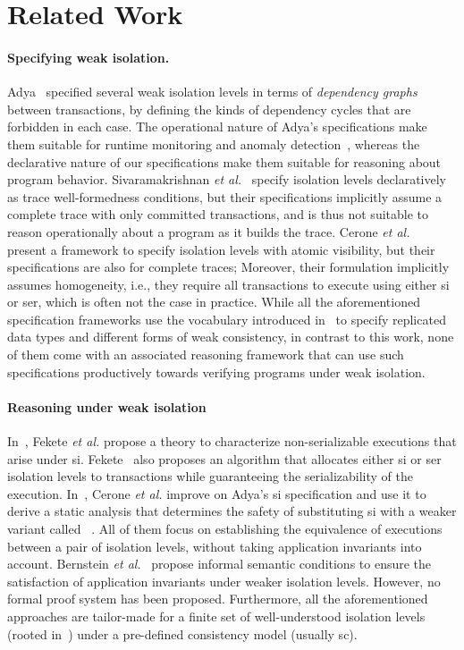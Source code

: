 \section{Related Work}
\label{sec:relatedwork}

\paragraph{Specifying weak isolation.}
Adya~\cite{adyaphd} specified several weak isolation levels in terms
of \emph{dependency graphs} between transactions, by defining the
kinds of dependency cycles that are forbidden in each case. The
operational nature of Adya's specifications make them suitable for
runtime monitoring and anomaly
detection~\cite{kemmevldb,feketesigmod08,pssi2011}, whereas the
declarative nature of our specifications make them suitable for
reasoning about program behavior. Sivaramakrishnan \emph{et
  al.}~\cite{pldi15} specify isolation levels declaratively as trace
well-formedness conditions, but their specifications implicitly assume
a complete trace with only committed transactions, and is thus not
suitable to reason operationally about a program as it builds the
trace. Cerone \emph{et al.}~\cite{gotsmanconcur15} present a framework
to specify isolation levels with atomic visibility, but their
specifications are also for complete traces; Moreover, their
formulation implicitly assumes homogeneity, i.e., they require all
transactions to execute using either {\sc si} or {\sc ser}, which is
often not the case in practice. While all the aforementioned
specification frameworks use the vocabulary introduced
in~\cite{burckhardt14} to specify replicated data types and different
forms of weak consistency, in contrast to this work, none of them come
with an associated reasoning framework that can use such
specifications productively towards verifying programs under weak
isolation.

\paragraph{Reasoning under weak isolation} In~\cite{feketessi}, Fekete
\emph{et al.} propose a theory to characterize non-serializable executions
that arise under {\sc si}. Fekete~\cite{fekete2005} also proposes an
algorithm that allocates either {\sc si} or {\sc ser} isolation levels
to transactions while guaranteeing the serializability of the
execution. In~\cite{gotsmanpodc16}, Cerone \emph{et al.} improve on Adya's
{\sc si} specification and use it to derive a static analysis that
determines the safety of substituting {\sc si} with a weaker variant
called ~\cite{psi}. All of them focus
on establishing the equivalence of executions between a pair of
isolation levels, without taking application invariants into account.
Bernstein \emph{et al.}~\cite{bern2000} propose informal semantic conditions
to ensure the satisfaction of application invariants under weaker
isolation levels.  However, no formal proof system has been proposed.
Furthermore, all the aforementioned approaches are tailor-made for a
finite set of well-understood isolation levels (rooted
in~\cite{berenson}) under a pre-defined consistency model (usually
{\sc sc}). 

